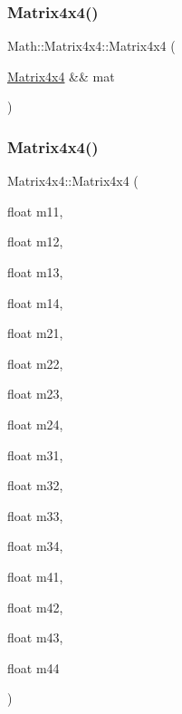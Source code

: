 \mbox{\label{struct_math_1_1_matrix4x4_adc4b241f8829fb8f3272909cd9d39966}} 
\subsubsection{\texorpdfstring{Matrix4x4()}{Matrix4x4()}\hspace{0.1cm}{\footnotesize\ttfamily [4/5]}}
{\footnotesize\ttfamily Math\+::\+Matrix4x4\+::\+Matrix4x4 (\begin{DoxyParamCaption}\item[{\mbox{\hyperlink{struct_math_1_1_matrix4x4}{Matrix4x4}} \&\&}]{mat }\end{DoxyParamCaption})}

\mbox{\label{struct_math_1_1_matrix4x4_a800b92eacd31be52d0ad1c52d74bd16a}} 
\subsubsection{\texorpdfstring{Matrix4x4()}{Matrix4x4()}\hspace{0.1cm}{\footnotesize\ttfamily [5/5]}}
{\footnotesize\ttfamily Matrix4x4\+::\+Matrix4x4 (\begin{DoxyParamCaption}\item[{float}]{m11,  }\item[{float}]{m12,  }\item[{float}]{m13,  }\item[{float}]{m14,  }\item[{float}]{m21,  }\item[{float}]{m22,  }\item[{float}]{m23,  }\item[{float}]{m24,  }\item[{float}]{m31,  }\item[{float}]{m32,  }\item[{float}]{m33,  }\item[{float}]{m34,  }\item[{float}]{m41,  }\item[{float}]{m42,  }\item[{float}]{m43,  }\item[{float}]{m44 }\end{DoxyParamCaption})}




